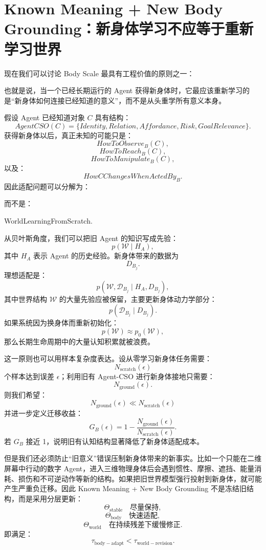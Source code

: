 \section{Known Meaning + New Body Grounding：新身体学习不应等于重新学习世界}

现在我们可以讨论 Body Scale 最具有工程价值的原则之一：
\begin{statementbox}
\centering
{}
\end{statementbox}
也就是说，当一个已经长期运行的 Agent 获得新身体时，它最应该重新学习的是“新身体如何连接已经知道的意义”，而不是从头重学所有意义本身。

假设 Agent 已经知道对象 $C$ 具有结构：
\[
AgentCSO(C)
=
\{
Identity,
Relation,
Affordance,
Risk,
GoalRelevance
\}.
\]
获得新身体以后，真正未知的可能只是：
\[
HowToObserve_B(C),
\]
\[
HowToReach_B(C),
\]
\[
HowToManipulate_B(C),
\]
以及：
\[
HowCChangesWhenActedBy_B.
\]
因此适配问题可以分解为：
\begin{statementbox}
\centering
{}
\end{statementbox}
而不是：
\begin{statementbox}
WorldLearningFromScratch.
\end{statementbox}

从贝叶斯角度，我们可以把旧 Agent 的知识写成先验：
\[
p(\mathcal W\mid H_A),
\]
其中 $H_A$ 表示 Agent 的历史经验。新身体带来的数据为
\[
D_{B_j}.
\]
理想适配是：
\[
p(\mathcal W,\mathcal D_{B_j}
\mid
H_A,D_{B_j}),
\]
其中世界结构 $\mathcal W$ 的大量先验应被保留，主要更新身体动力学部分：
\[
p(\mathcal D_{B_j}\mid D_{B_j}).
\]
如果系统因为换身体而重新初始化：
\[
p(\mathcal W)\approx p_0(\mathcal W),
\]
那么长期生命周期中的大量认知积累就被浪费。

这一原则也可以用样本复杂度表达。设从零学习新身体任务需要：
\[
N_{\mathrm{scratch}}(\epsilon)
\]
个样本达到误差 $\epsilon$；利用旧有 Agent-CSO 进行新身体接地只需要：
\[
N_{\mathrm{ground}}(\epsilon).
\]
则我们希望：
\[
\boxed{
N_{\mathrm{ground}}(\epsilon)
\ll
N_{\mathrm{scratch}}(\epsilon)
}
\]
并进一步定义迁移收益：
\[
G_B(\epsilon)
=
1-
\frac{
N_{\mathrm{ground}}(\epsilon)
}{
N_{\mathrm{scratch}}(\epsilon)
}.
\]
若 $G_B$ 接近 1，说明旧有认知结构显著降低了新身体适配成本。

但是我们还必须防止“旧意义”错误压制新身体带来的新事实。比如一个只能在二维屏幕中行动的数字 Agent，进入三维物理身体后会遇到惯性、摩擦、遮挡、能量消耗、损伤和不可逆动作等新的结构。如果把旧世界模型强行投射到新身体，就可能产生严重负迁移。因此 Known Meaning + New Body Grounding 不是冻结旧结构，而是采用分层更新：
\[
\Theta_{\mathrm{stable}}
\quad \text{尽量保持},
\]
\[
\Theta_{\mathrm{body}}
\quad \text{快速适配},
\]
\[
\Theta_{\mathrm{world}}
\quad \text{在持续残差下缓慢修正}.
\]
即满足：
\[
\tau_{\mathrm{body-adapt}}
<
\tau_{\mathrm{world-revision}}.
\]

